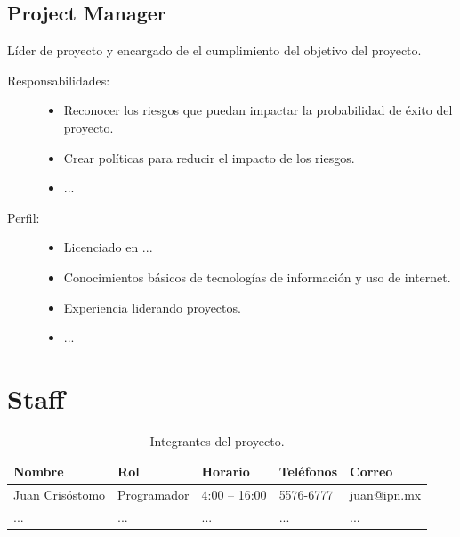 \subsection{Project Manager}
	Líder de proyecto y encargado de el cumplimiento del objetivo del proyecto.

\begin{description}
	\item[Responsabilidades:] \cdtEmpty 	
    \begin{itemize}
    	\item Reconocer los riesgos que puedan impactar la probabilidad de éxito del proyecto.
		\item Crear políticas para reducir el impacto de los riesgos.
		\item ...
    \end{itemize}
	\item[Perfil:] \cdtEmpty	
    \begin{itemize}
       	\item Licenciado en ...
		\item Conocimientos básicos de tecnologías de información y uso de internet.
		\item Experiencia liderando proyectos.
		\item ...
    \end{itemize}
\end{description}

\section{Staff}


\begin{table}[hbtp!]
    \noindent\begin{tabular}{|p{}|p{}|p{}|p{}|p{}|}
    	\hline
    	{\bf Nombre} & {\bf Rol} & {\bf Horario} & {\bf Teléfonos} & {\bf Correo}\\
    	\hline
    	Juan Crisóstomo & Programador & 4:00 -- 16:00 & 5576-6777 & juan@ipn.mx \\
    	\hline
    	... & ... & ... & ... & ... \\
    	\hline
    \end{tabular}
	\caption{Integrantes del proyecto.}
	\label{tbl:staff}
\end{table}

